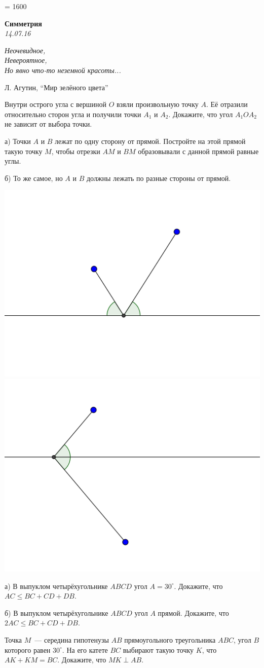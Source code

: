 \tolerance = 1600

\begin{center}
\textbf{\Large Симметрия}\\
\textit{14.07.16}
\end{center}

\epigraph{\it Неочевидное, \\ Невероятное, \\ Но явно что-то неземной красоты...}{Л. Агутин, ``Мир зелёного цвета''}

\begin{problems}
\item Внутри острого угла с вершиной $O$ взяли произвольную точку $A$. Её отразили относительно сторон угла и получили точки $A_1$ и $A_2$. Докажите, что угол $A_1OA_2$ не зависит от выбора точки.

\item а) Точки $A$ и $B$ лежат по одну сторону от прямой. Постройте на этой прямой такую точку $M$, чтобы отрезки $AM$ и $BM$ образовывали с данной прямой равные углы.

б) То же самое, но $A$ и $B$ должны лежать по разные стороны от прямой.

\begin{center}
\includegraphics[width=.35\textwidth]{simm01}
\includegraphics[width=.35\textwidth]{simm02}
\end{center}

\item а) В выпуклом четырёхугольнике $ABCD$ угол $A = 30^\circ$. Докажите, что ${AC \leqslant BC + CD + DB}$.

б) В выпуклом четырёхугольнике $ABCD$ угол $A$ прямой. Докажите, что ${2AC \leqslant BC + CD + DB}$.

\item Точка $M$~--- середина гипотенузы $AB$ прямоугольного треугольника $ABC$, угол $B$ которого равен $30^\circ$. На его катете $BC$ выбирают такую точку $K$, что $AK + KM = BC$. Докажите, что $MK\perp AB$.


\end{problems}
